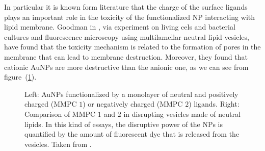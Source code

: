 In particular it is known form literature that the charge of the surface ligands plays an important role in the toxicity of the functionalized \ac{NP} interacting with lipid membrane. Goodman \etal in \cite{Goodman2004}, via experiment on living cels and bacterial cultures and fluorescence microscopy using multilamellar neutral lipid vesicles, have found that the toxicity mechanism is related to the formation of pores in the membrane that can lead to membrane destruction. Moreover, they found that cationic \acp{AuNP} are more destructive than the anionic one, as we can see from figure~(\ref{fig:goodman}).
\begin{figure}[!ht]
	\centering
	\qquad\qquad%
	\caption{Left: \acp{AuNP} functionalized by a monolayer of neutral and positively charged (MMPC $1$) or negatively charged (MMPC $2$) ligands. Right: Comparison of MMPC $1$ and $2$ in disrupting vesicles made of neutral lipids. In this kind of essays, the disruptive power of the \acp{NP} is quantified by the amount of fluorescent dye that is released from the vesicles. Taken from \cite{Goodman2004}.}%
	\label{fig:goodman}
\end{figure}

